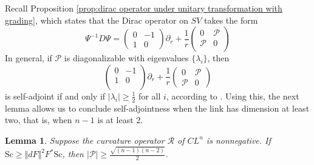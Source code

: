 \documentclass[12pt, reqno]{amsart}
\theoremstyle{plain} %
\newtheorem{lemma}[theorem]{Lemma}
\theoremstyle{definition}
\theoremstyle{remark}
\numberwithin{equation}{section}
\newcommand{\dom}[1]{\hat{#1}}
\newcommand{\onorm}[1]{\Vert #1 \Vert}
\newcommand{\abs}[1]{\lvert #1 \rvert}
\newcommand{\Sc}{\mathrm{Sc}}
\begin{document}
Recall Proposition \ref{prop:dirac operator under unitary transformation with grading}, which states that the Dirac operator on \(SV\) takes the form
\begin{equation}
    \Psi^{-1}D\Psi = \begin{pmatrix}
    0 & -1\\
    1 & 0
    \end{pmatrix}\partial_r + \frac{1}{r}\begin{pmatrix}
        0 & \mathcal{P}\\
        \mathcal{P} & 0\\
    \end{pmatrix}
\end{equation}
In general, if \(\mathcal{P}\) is diagonalizable with eigenvalues \(\{\lambda_i\}\), then
\begin{equation*}
    \begin{pmatrix}
        0 & -1\\
        1 & 0\\
    \end{pmatrix}\partial_r + \frac{1}{r}\begin{pmatrix}
        0 & \mathcal{P}\\
        \mathcal{P} & 0
    \end{pmatrix}
\end{equation*}
is self-adjoint if and only if \(|\lambda_i| \geq \frac{1}{2}\) for all \(i\), according to \cite{Bruning:1988}.
Using this, the next lemma allows us to conclude self-adjointness when the link has dimension at least two, that is, when \(n-1\) is at least 2.
\begin{lemma}\label{lem:link Dirac operator estimate}
    Suppose the curvature operator \(\mathcal{R}\) of \(CL^n\) is nonnegative.
    If \(\dom{\Sc} \geq \onorm{d F}^2 F^*\Sc\), then \(\abs{\mathcal{P}} \geq \frac{ \sqrt{ (n-1)(n-2) } }{2}\).
\end{lemma}
\end{document}
